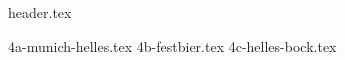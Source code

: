 \clearpage
{}
\divisorLine

{header.tex}

\begin{multicols}{2}

{4a-munich-helles.tex}
{4b-festbier.tex}
{4c-helles-bock.tex}

\end{multicols}